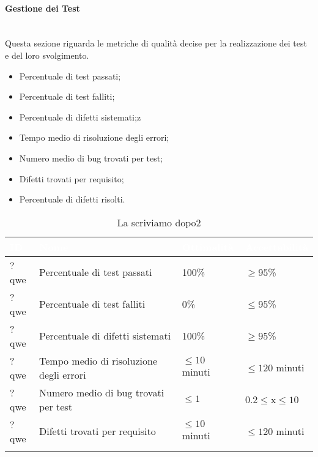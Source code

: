 \paragraph{Gestione dei Test}\-\\
Questa sezione riguarda le metriche di qualità decise per la realizzazione dei test e del loro svolgimento. 

\begin{itemize}
	\item Percentuale di test passati;
	\item Percentuale di test falliti;
	\item Percentuale di difetti sistemati;z
	\item Tempo medio di risoluzione degli errori;
	\item Numero medio di bug trovati per test;
	\item Difetti trovati per requisito;
	\item Percentuale di difetti risolti.
\end{itemize}

\begin{longtable}{|C{.15\textwidth}|C{.24\textwidth}|C{.24\textwidth}|C{.24\textwidth}|}
\hline
{}\textbf{\textcolor{white}{ID}} & \textbf{\textcolor{white}{Nome}} & \textbf{\textcolor{white}{Ottimalità}} & \textbf{\textcolor{white}{Accettabilità}}\\
\hline \hline
\endfirsthead
?qwe & Percentuale di test passati & 100\% & $\geq 95$\%\\
\hline
{}?qwe & Percentuale di test falliti & 0\% & $\leq 95$\%\\
\hline
?qwe & Percentuale di difetti sistemati & 100\% & $\geq 95$\%\\
\hline
{}?qwe & Tempo medio di risoluzione degli errori & $\leq 10$ minuti & $\leq 120$ minuti\\
\hline
?qwe & Numero medio di bug trovati per test & $\leq 1$ & 0.2$\leq$x$\leq 10$  \\
\hline
{}?qwe & Difetti trovati per requisito & $\leq 10$ minuti & $\leq 120$ minuti\\
\hline
\caption{La scriviamo dopo2}
\label{La scriviamo dopo2}
\end{longtable}
